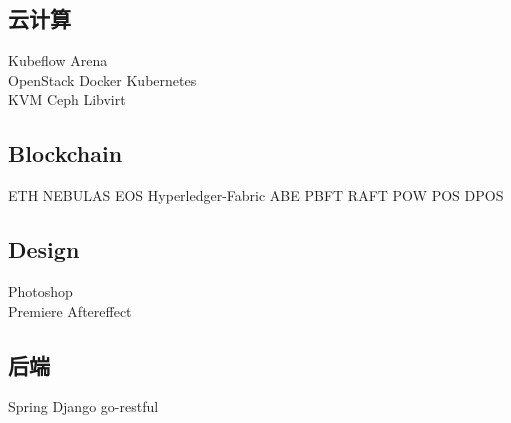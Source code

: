 \documentclass[]{deedy-resume-openfont}
\begin{document}
\begin{minipage}[t]{0.3\textwidth}
\subsection{云计算}
Kubeflow \textbullet{} Arena  \\
OpenStack \textbullet{} Docker \textbullet{} Kubernetes \\
KVM \textbullet{} Ceph \textbullet{} Libvirt \\
\sectionsep

\subsection{Blockchain}
ETH \textbullet{} NEBULAS \textbullet{} EOS \textbullet{} Hyperledger-Fabric \textbullet{} ABE \textbullet{} PBFT \textbullet{} RAFT \textbullet{} POW \textbullet{} POS \textbullet{} DPOS \\
\sectionsep

\subsection{Design}
Photoshop \\
Premiere \textbullet{} Aftereffect \\
\sectionsep

\subsection{后端}
Spring \textbullet{} Django \textbullet{} go-restful \\
\sectionsep

\end{minipage}
\hfill
\begin{minipage}[t]{0.68\textwidth}

%
%

\end{minipage}
\hfill
\end{document}
